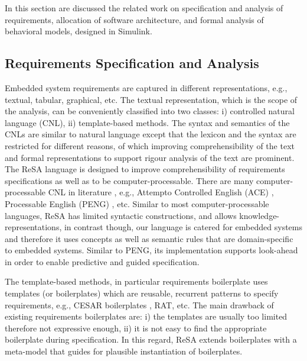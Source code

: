 In this section are discussed the related work on specification and analysis of requirements, allocation of software architecture, and formal analysis of behavioral models, designed in Simulink.

\subsection{Requirements Specification and Analysis}
Embedded system requirements are captured in different representations, e.g., textual, tabular, graphical, etc. The textual representation, which is the scope of the analysis, can be conveniently classified into two classes: i) controlled natural language (CNL), ii) template-based methods.  The syntax and semantics of the CNLs are similar to natural language except that the lexicon and the syntax are restricted for different reasons, of which improving comprehensibility of the text and formal representations to support rigour analysis of the text are prominent. The ReSA language is designed to improve comprehensibility of requirements specifications as well as to be computer-processable. There are many computer-processable CNL in literature \cite{Kuhn2014ALanguages}, e.g., Attempto Controlled English (ACE) \cite{attempto96}, Processable English (PENG) \cite{Schwitter2002EnglishLanguage}, etc. Similar to most computer-processable languages, ReSA has limited syntactic constructions, and allows knowledge-representations, in contrast though, our language is catered for embedded systems and therefore it uses concepts as well as semantic rules that are domain-specific to embedded systems. Similar to PENG, its implementation supports look-ahead in order to enable predictive and guided specification.

The template-based methods, in particular requirements boilerplate uses templates (or boilerplates) which are reusable, recurrent patterns to specify requirements, e.g., CESAR boilerplates \cite{Farfeleder2011DODT:Development}, RAT, etc. The main drawback of existing requirements boilerplates are: i) the templates are usually too limited therefore not expressive enough, ii) it is not easy to find the appropriate boilerplate during specification. In this regard, ReSA extends boilerplates with a meta-model that guides for plausible instantiation of boilerplates.

